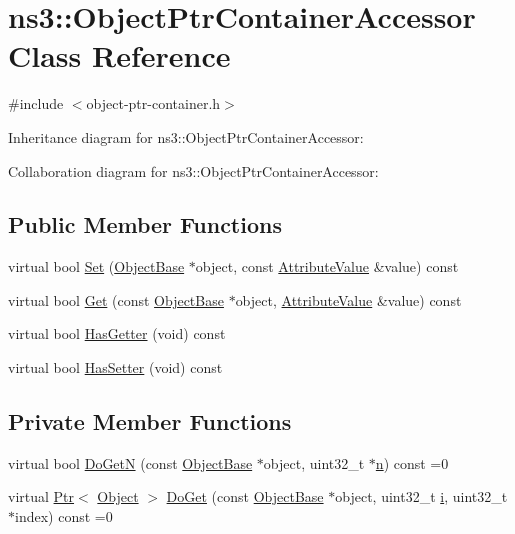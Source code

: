 \hypertarget{classns3_1_1ObjectPtrContainerAccessor}{}\section{ns3\+:\+:Object\+Ptr\+Container\+Accessor Class Reference}
\label{classns3_1_1ObjectPtrContainerAccessor}


{\ttfamily \#include $<$object-\/ptr-\/container.\+h$>$}



Inheritance diagram for ns3\+:\+:Object\+Ptr\+Container\+Accessor\+:


Collaboration diagram for ns3\+:\+:Object\+Ptr\+Container\+Accessor\+:
\subsection*{Public Member Functions}
\begin{DoxyCompactItemize}
\item 
virtual bool \hyperlink{classns3_1_1ObjectPtrContainerAccessor_a59e0b3a58b2808c5f474ae5cfec5d21a}{Set} (\hyperlink{classns3_1_1ObjectBase}{Object\+Base} $\ast$object, const \hyperlink{classns3_1_1AttributeValue}{Attribute\+Value} \&value) const 
\item 
virtual bool \hyperlink{classns3_1_1ObjectPtrContainerAccessor_ad5dbec0444a32e5af53ddd7dfb4ae47e}{Get} (const \hyperlink{classns3_1_1ObjectBase}{Object\+Base} $\ast$object, \hyperlink{classns3_1_1AttributeValue}{Attribute\+Value} \&value) const 
\item 
virtual bool \hyperlink{classns3_1_1ObjectPtrContainerAccessor_a77d546ecb9baafdaa9a264a87c841e47}{Has\+Getter} (void) const 
\item 
virtual bool \hyperlink{classns3_1_1ObjectPtrContainerAccessor_a02b70055bdfe68459f0f3088ab2d791e}{Has\+Setter} (void) const 
\end{DoxyCompactItemize}
\subsection*{Private Member Functions}
\begin{DoxyCompactItemize}
\item 
virtual bool \hyperlink{classns3_1_1ObjectPtrContainerAccessor_af64498cfd84f9c5315e666c976cc227a}{Do\+GetN} (const \hyperlink{classns3_1_1ObjectBase}{Object\+Base} $\ast$object, uint32\+\_\+t $\ast$\hyperlink{lte__link__budget__x2__handover__measures_8m_abdb05bc5a064cf642a06c83b3392f148}{n}) const =0
\item 
virtual \hyperlink{classns3_1_1Ptr}{Ptr}$<$ \hyperlink{classns3_1_1Object}{Object} $>$ \hyperlink{classns3_1_1ObjectPtrContainerAccessor_a8c435803098d1397bbde51c4db62db34}{Do\+Get} (const \hyperlink{classns3_1_1ObjectBase}{Object\+Base} $\ast$object, uint32\+\_\+t \hyperlink{lte__uplink__power__control_8m_a6f6ccfcf58b31cb6412107d9d5281426}{i}, uint32\+\_\+t $\ast$index) const =0
\end{DoxyCompactItemize}
